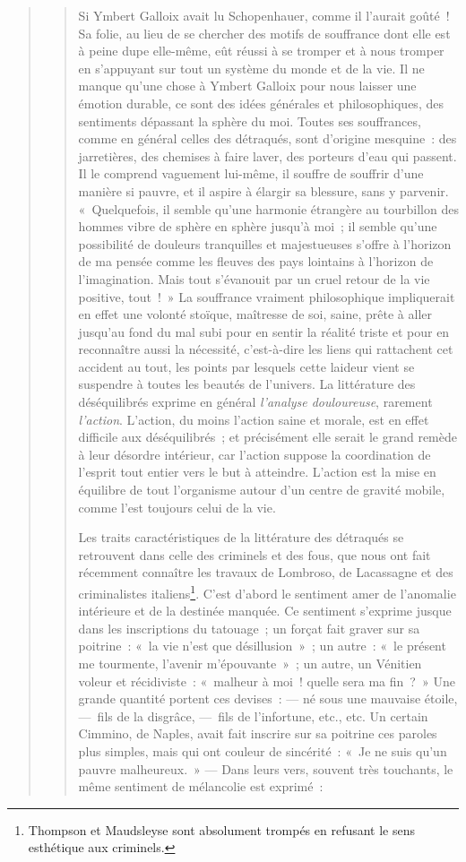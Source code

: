 \documentclass[french,twoside]{book} %
\begin{document}
\begin{verse}
\begin{verse}
Si Ymbert Galloix avait lu Schopenhauer, comme il l’aurait goûté ! Sa folie, au lieu de se chercher des motifs de souffrance dont elle est à peine dupe elle-même, eût réussi à se tromper et à nous tromper en s’appuyant sur tout un système du monde et de la vie. Il ne manque qu’une chose à Ymbert Galloix pour nous laisser une émotion durable, ce sont des idées générales et philosophiques, des sentiments dépassant la sphère du moi. Toutes ses souffrances, comme en général celles des détraqués, sont d’origine mesquine : des jarretières, des chemises à faire laver, des porteurs d’eau qui passent. Il le comprend vaguement lui-même, il souffre de souffrir d’une manière si pauvre, et il aspire à élargir sa blessure, sans y parvenir. « Quelquefois, il semble qu’une harmonie étrangère au tourbillon des hommes vibre de sphère en sphère jusqu’à moi ; il semble qu’une possibilité de douleurs tranquilles et majestueuses s’offre à l’horizon de ma pensée comme les fleuves des pays lointains à l’horizon de l’imagination. Mais tout s’évanouit par un cruel retour de la vie positive, tout ! » La souffrance vraiment philosophique impliquerait en effet une volonté stoïque, maîtresse de soi, saine, prête à aller jusqu’au fond du mal subi pour en sentir la réalité triste et pour en reconnaître aussi la nécessité, c’est-à-dire les liens qui rattachent cet accident au tout, les points par lesquels cette laideur vient se suspendre à toutes les beautés de l’univers. La littérature des déséquilibrés exprime en général \emph{l’analyse douloureuse}, rarement \emph{l’action}. L’action, du moins l’action saine et morale, est en effet difficile aux déséquilibrés ; et précisément elle serait le grand remède à leur désordre intérieur, car l’action suppose la coordination de l’esprit tout entier vers le but à atteindre. L’action est la mise en équilibre de tout l’organisme autour d’un centre de gravité mobile, comme l’est toujours celui de la vie.\par
Les traits caractéristiques de la littérature des détraqués se retrouvent dans celle des criminels et des fous, que nous ont fait récemment connaître les travaux de Lombroso, de Lacassagne et des criminalistes italiens\footnote{Thompson et Maudsleyse sont absolument trompés en refusant le sens esthétique aux criminels.}. C’est d’abord le sentiment amer de l’anomalie intérieure et de la destinée manquée. Ce sentiment s’exprime jusque dans les inscriptions du tatouage ; un forçat fait graver sur sa poitrine : « la vie n’est que désillusion » ; un autre : « le présent me tourmente, l’avenir m’épouvante » ; un autre, un Vénitien voleur et récidiviste : « malheur à moi ! quelle sera ma fin ? » Une grande quantité portent ces devises : — né sous une mauvaise étoile, — fils de la disgrâce, — fils de l’infortune, etc., etc. Un certain Cimmino, de Naples, avait fait inscrire sur sa poitrine ces paroles plus simples, mais qui ont couleur de sincérité : « Je ne suis qu’un pauvre malheureux. » — Dans leurs vers, souvent très touchants, le même sentiment de mélancolie est exprimé :\par



\end{verse}
\end{verse}
\end{document}
